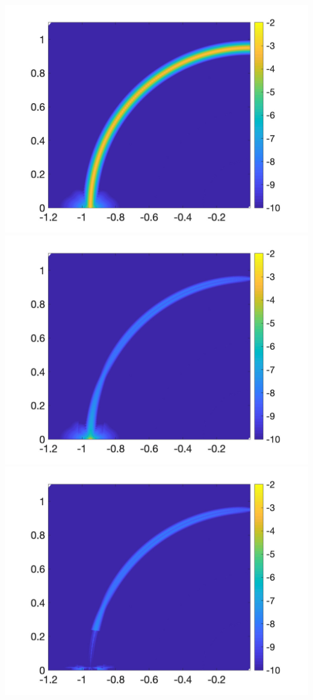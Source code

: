 \includegraphics[trim=40 20 40 10, clip, width=2.5truein]{figs/fig200a} 
\includegraphics[trim=40 20 40 10, clip, width=2.5truein]{figs/fig200b} 
\includegraphics[trim=40 20 40 10, clip, width=2.5truein]{figs/fig200c}\\ 
